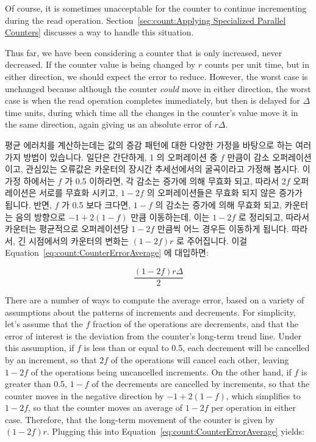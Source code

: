 {	Of course, it is sometimes unacceptable for the counter to
	continue incrementing during the read operation.
	Section~\ref{sec:count:Applying Specialized Parallel Counters}
	discusses a way to handle this situation.

	Thus far, we have been considering a counter that is only
	increased, never decreased.
	If the counter value is being changed by $r$ counts per unit
	time, but in either direction, we should expect the error
	to reduce.
	However, the worst case is unchanged because although the
	counter \emph{could} move in either direction, the worst
	case is when the read operation completes immediately,
	but then is delayed for $\Delta$ time units, during which
	time all the changes in the counter's value move it in
	the same direction, again giving us an absolute error
	of $r \Delta$.
	\fi

	평균 에러치를 계산하는데는 값의 증감 패턴에 대한 다양한 가정을 바탕으로
	하는 여러가지 방법이 있습니다.
	일단은 간단하게, 1 의 오퍼레이션 중 $f$ 만큼이 감소 오퍼레이션이고,
	관심있는 오류값은 카운터의 장시간 추세선에서의 굴곡이라고 가정해
	봅시다.
	이 가정 하에서는 $f$ 가 0.5 이하라면, 각 감소는 증가에 의해 무효화
	되고, 따라서 $2f$ 오퍼레이션은 서로를 무효화 시키고, $1-2f$ 의
	오퍼레이션들은 무효화 되지 않은 증가가 됩니다.
	반면, $f$ 가 0.5 보다 크다면, $1-f$ 의 감소는 증가에 의해 무효화 되고,
	카운터는 음의 방향으로 $-1+2\left(1-f\right)$ 만큼 이동하는데, 이는
	$1-2f$ 로 정리되고, 따라서 카운터는 평균적으로 오퍼레이션당 $1-2f$
	만큼씩 어느 경우든 이동하게 됩니다.
	따라서, 긴 시점에서의 카운터의 변화는 $\left( 1-2f \right) r$ 로
	주어집니다.
	이걸 Equation~\ref{eq:count:CounterErrorAverage} 에 대입하면:

	\begin{equation}
		\frac{\left( 1 - 2 f \right) r \Delta}{2}
	\end{equation}
	\iffalse

	There are a number of ways to compute the average error,
	based on a variety of assumptions about the patterns of
	increments and decrements.
	For simplicity, let's assume that the $f$ fraction of
	the operations are decrements, and that the error of interest
	is the deviation from the counter's long-term trend line.
	Under this assumption, if $f$ is less than or equal to 0.5,
	each decrement will be cancelled by an increment, so that
	$2f$ of the operations will cancel each other, leaving
	$1-2f$ of the operations being uncancelled increments.
	On the other hand, if $f$ is greater than 0.5, $1-f$ of
	the decrements are cancelled by increments, so that the
	counter moves in the negative direction by $-1+2\left(1-f\right)$,
	which simplifies to $1-2f$, so that the counter moves an average
	of $1-2f$ per operation in either case.
	Therefore, that the long-term
	movement of the counter is given by $\left( 1-2f \right) r$.
	Plugging this into
	Equation~\ref{eq:count:CounterErrorAverage} yields:

}
